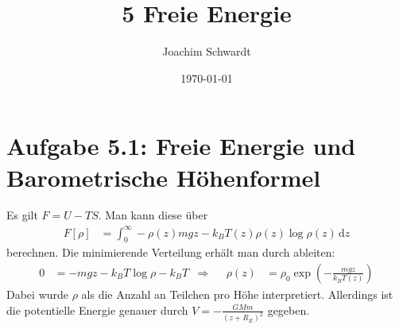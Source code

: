 \documentclass[a4paper,12pt]{article}
\newcommand{\intx}{}
\newcommand{\kla}{}
\begin{document}
\title{5 Freie Energie}
\author{Joachim Schwardt}
\date{\today}
\maketitle

\section*{Aufgabe 5.1: Freie Energie und Barometrische Höhenformel}
Es gilt $F=U-TS$. Man kann diese über
\begin{align*}
F[\rho]&=\intx\int_{0}^{\infty}-\rho(z)mgz-k_BT(z)\rho(z)\log\rho(z)\,\mathrm{d}z
\end{align*}
berechnen. Die minimierende Verteilung erhält man durch ableiten:
\begin{align*}
0&=-mgz-k_BT\log\rho -k_BT&\Rightarrow &&\rho(z)&=\rho_0\exp\kla\left( {-\frac{mgz}{k_BT(z)}} \right)
\end{align*}
Dabei wurde $\rho$ als die Anzahl an Teilchen pro Höhe interpretiert. Allerdings ist die potentielle Energie genauer durch $V=-\frac{GMm}{(z+R_E)^2}$ gegeben.
\end{document}
